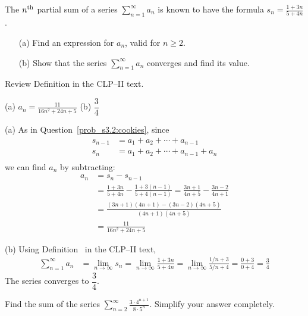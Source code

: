 \begin{question}[2016Q5]
The $n^{\rm th}$ partial sum of a series  $\displaystyle \sum_{n=1}^{\infty}a_n $ is known to
have the formula $\displaystyle s_n = \frac{1+3n}{5+4n}$.
\begin{enumerate}[(a)]
  \item[(a)] Find an expression for $a_n$, valid for $n\ge2$.
  \item[(b)] Show that the series $\displaystyle \sum_{n=1}^{\infty}a_n $ converges
         and find its value.
\end{enumerate}
\end{question}

\begin{hint}
Review Definition   in the CLP--II text.
\end{hint}

\begin{answer}
(a) $\displaystyle a_n= \frac{11}{16n^2 + 24n +5}$
\qquad (b) $ \dfrac{3}{4}$

\end{answer}

\begin{solution} (a)
As in Question~\ref{prob_s3.2:cookies}, since
\begin{align*}
s_{n-1}& = a_1+a_2+ \cdots + a_{n-1} \\
s_{n}& = a_1+a_2+ \cdots + a_{n-1} +a_n\\
\end{align*}
we can find $a_n$ by subtracting:
\begin{align*}
a_n &= s_n - s_{n-1} \\
&=\frac{1 + 3n}{5+4n} - \frac{1 + 3(n-1)}{5+4(n-1)}
= \frac{3n+1}{4n+5} - \frac{3n - 2}{4n+1}\\
&=  \frac{(3n+1)(4n+1) - (3n - 2) (4n+5)}{(4n+1)(4n+5)} \\
&= \frac{11}{16n^2 + 24n +5}
\end{align*}

\noindent (b)
Using Definition~ in the CLP--II text,
\begin{align*}
\sum_{n=1}^\infty a_n&= \lim_{n \to \infty}  s_n
  = \lim_{n \to \infty} \frac{1 + 3n}{5+4n}
  = \lim_{n \to \infty} \frac{1/n + 3}{5/n+4}
  = \frac{0+3}{0+4}
  = \frac{3}{4}
\end{align*}
The series converges to $\dfrac{3}{4}$.
\end{solution}


\begin{Mquestion}[2013A]
Find the sum of the series
$ \displaystyle\sum\limits_{n=2}^\infty \frac{3\cdot 4^{n+1}}{8\cdot 5^n}$.
Simplify your answer completely.
\end{Mquestion}

